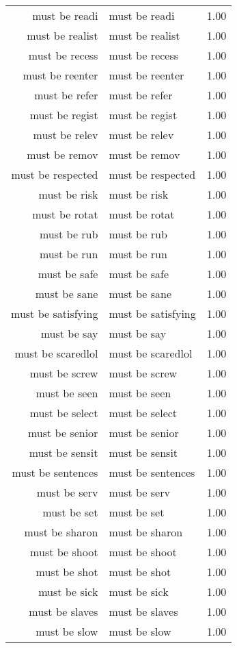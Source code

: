 \begin{table}[ht]
\begin{tabular}{rlr}
  must be readi & must be readi & 1.00 \\ 
  must be realist & must be realist & 1.00 \\ 
  must be recess & must be recess & 1.00 \\ 
  must be reenter & must be reenter & 1.00 \\ 
  must be refer & must be refer & 1.00 \\ 
  must be regist & must be regist & 1.00 \\ 
  must be relev & must be relev & 1.00 \\ 
  must be remov & must be remov & 1.00 \\ 
  must be respected & must be respected & 1.00 \\ 
  must be risk & must be risk & 1.00 \\ 
  must be rotat & must be rotat & 1.00 \\ 
  must be rub & must be rub & 1.00 \\ 
  must be run & must be run & 1.00 \\ 
  must be safe & must be safe & 1.00 \\ 
  must be sane & must be sane & 1.00 \\ 
  must be satisfying & must be satisfying & 1.00 \\ 
  must be say & must be say & 1.00 \\ 
  must be scaredlol & must be scaredlol & 1.00 \\ 
  must be screw & must be screw & 1.00 \\ 
  must be seen & must be seen & 1.00 \\ 
  must be select & must be select & 1.00 \\ 
  must be senior & must be senior & 1.00 \\ 
  must be sensit & must be sensit & 1.00 \\ 
  must be sentences & must be sentences & 1.00 \\ 
  must be serv & must be serv & 1.00 \\ 
  must be set & must be set & 1.00 \\ 
  must be sharon & must be sharon & 1.00 \\ 
  must be shoot & must be shoot & 1.00 \\ 
  must be shot & must be shot & 1.00 \\ 
  must be sick & must be sick & 1.00 \\ 
  must be slaves & must be slaves & 1.00 \\ 
  must be slow & must be slow & 1.00 \\ 

\end{tabular}
\end{table}
